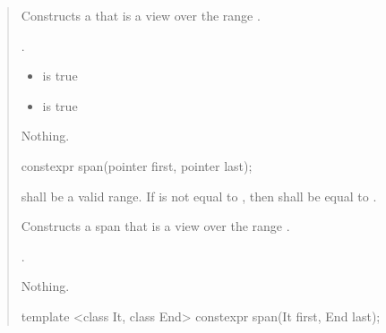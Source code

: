 \documentclass{wg21}
\begin{document}
\begin{quote}
\begin{itemdescr}
    \pnum
    \effects
    Constructs a  that is a view over the range .

    \pnum
    \ensures
    \begin{removedblock}
    	.
    \end{removedblock}
    \begin{addedblock}
    \begin{itemize}
    	\item {} is true
    	\item {} is true
    \end{itemize}
	\end{addedblock}	
    		

    \pnum
    \throws
    Nothing.

\end{itemdescr}


\begin{removedblock}
\begin{itemdecl}
constexpr span(pointer first, pointer last);
\end{itemdecl}
\end{removedblock}
\begin{removedblock}

\begin{itemdescr}
    \pnum
    \requires
     shall be a valid range.
    If  is not equal to ,
    then  shall be equal to .

    \pnum
    \effects
    Constructs a span that is a view over the range .

    \pnum
    \ensures
    .

    \pnum
    \throws
    Nothing.
\end{itemdescr}
\end{removedblock}

\begin{addedblock}
\begin{itemdecl}
template <class It, class End>
constexpr span(It first, End last);
\end{itemdecl}
\end{addedblock}


\end{quote}
\end{document}
